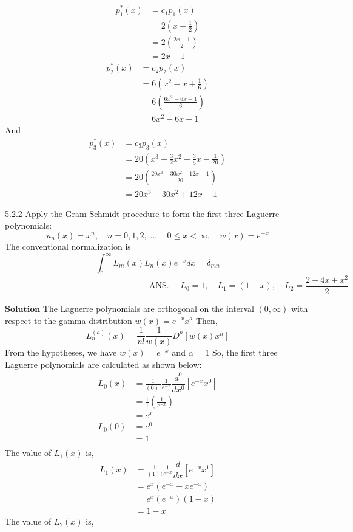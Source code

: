 $$
\begin{aligned}
p_{1}^{*}(x) &=c_{1} p_{1}(x) \\
&=2\left(x-\frac{1}{2}\right) \\
&=2\left(\frac{2 x-1}{2}\right) \\
&=2x-1
\end{aligned}
$$
$$
\begin{aligned}
p_{2}^{*}(x) &=c_{2} p_{2}(x) \\
&=6\left(x^{2}-x+\frac{1}{6}\right) \\
&=6\left(\frac{6 x^{2}-6 x+1}{6}\right)\\
&=6x^2-6x+1
\end{aligned}
$$
And
$$
\begin{aligned}
p_{3}^{*}(x) &=c_{3} p_{3}(x) \\
&=20\left(x^{3}-\frac{3}{2} x^{2}+\frac{3}{5} x-\frac{1}{20}\right) \\
&=20\left(\frac{20 x^{3}-30 x^{2}+12 x-1}{20}\right) \\
&=20x^3 -30x^2+12x-1
\end{aligned}
$$


\newpage

\begin{mybox}{5.2.2}
Apply the Gram-Schmidt procedure to form the first three Laguerre polynomials:
$$
u_{n}(x)=x^{n}, \quad n=0,1,2, \ldots, \quad 0 \leq x<\infty, \quad w(x)=e^{-x}
$$
The conventional normalization is
$$
\int_{0}^{\infty} L_{m}(x) L_{n}(x) e^{-x} d x=\delta_{m n}
$$
$$
\hspace{7cm}\text { ANS. } \quad L_{0}=1, \quad L_{1}=(1-x), \quad L_{2}=\frac{2-4 x+x^{2}}{2}
$$
\end{mybox}

$\boxed{\textbf{Solution}}$ The Laguerre polynomials are orthogonal on the interval $(0, \infty)$ with respect to the gamma
distribution $w(x)=e^{-x} x^{a}$
Then,
$$L_{n}^{(a)}(x)=\frac{1}{n !} \frac{1}{w(x)} D^{n}\left[w(x) x^{n}\right]$$
From the hypotheses, we have
$w(x)=e^{-x}$ and $\alpha=1$ So, the first three Laguerre polynomials are calculated as shown below:
$$
\begin{aligned}
L_{0}(x) &=\frac{1}{(0) !} \frac{1}{e^{-x}} \dfrac{d^0}{dx^0}\left[e^{-x} x^{0}\right] \\
&=\frac{1}{1}\left(\frac{1}{e^{-x}}\right) \\
&=e^{x} \\
L_{0}(0)&=e^{0} \\
&=1 \\
\end{aligned}
$$
The value of $L_{1}(x)$ is,
$$
\begin{aligned}
L_{1}(x) &=\frac{1}{(1) !} \frac{1}{e^{-x}} \dfrac{d}{dx}\left[e^{-x} x^{1}\right] \\
&=e^{x}\left(e^{-x}-x e^{-x}\right) \\
&=e^{x}\left(e^{-x}\right)(1-x) \\
&=1-x
\end{aligned}
$$
The value of $L_{2}(x)$ is,

